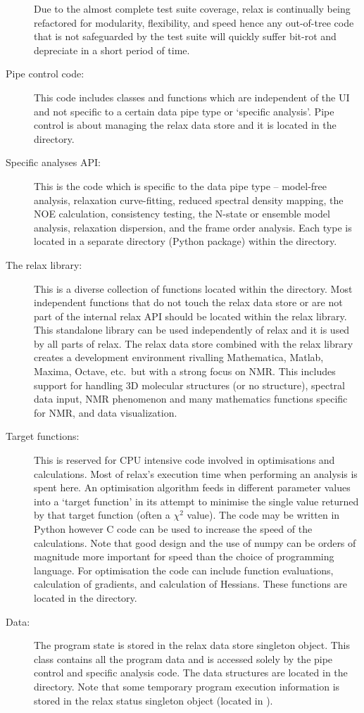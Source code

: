 \begin{description}
    Due to the almost complete test suite coverage, relax is continually being refactored for modularity, flexibility, and speed hence any out-of-tree code that is not safeguarded by the test suite will quickly suffer bit-rot and depreciate in a short period of time.
  \item[Pipe control code:]  This code includes classes and functions which are independent of the UI and not specific to a certain data pipe type or `specific analysis'.
    Pipe control is about managing the relax data store and it is located in the  directory.
  \item[Specific analyses API:]  This is the code which is specific to the data pipe type -- model-free analysis, relaxation curve-fitting, reduced spectral density mapping, the NOE calculation, consistency testing, the N-state or ensemble model analysis, relaxation dispersion, and the frame order analysis.
    Each type is located in a separate directory (Python package) within the  directory.
  \item[The relax library:]  This is a diverse collection of functions located within the  directory.
      Most independent functions that do not touch the relax data store or are not part of the internal relax API should be located within the relax library.
      This standalone library can be used independently of relax and it is used by all parts of relax.
      The relax data store combined with the relax library creates a development environment rivalling Mathematica, Matlab, Maxima, Octave, etc.\ but with a strong focus on NMR.
      This includes support for handling 3D molecular structures (or no structure), spectral data input, NMR phenomenon and many mathematics functions specific for NMR, and data visualization.
  \item[Target functions:]  This is reserved for CPU intensive code involved in optimisations and calculations.
    Most of relax's execution time when performing an analysis is spent here.
    An optimisation algorithm feeds in different parameter values into a `target function' in its attempt to minimise the single value returned by that target function (often a $\chi^2$ value).
    The code may be written in Python however C code can be used to increase the speed of the calculations.
    Note that good design and the use of numpy can be orders of magnitude more important for speed than the choice of programming language.
    For optimisation the code can include function evaluations, calculation of gradients, and calculation of Hessians.
    These functions are located in the  directory.
  \item[Data:]  The program state is stored in the relax data store singleton object.
    This class contains all the program data and is accessed solely by the pipe control and specific analysis code.
    The data structures are located in the  directory.
    Note that some temporary program execution information is stored in the relax status singleton object (located in ).
\end{description}





